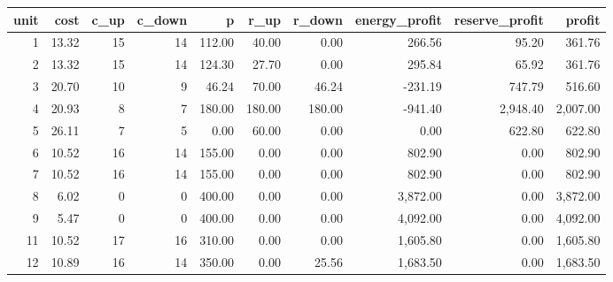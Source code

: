 \begin{tabular}{rrrrrrrrrr}
\toprule
unit & cost & c\_up & c\_down & p & r\_up & r\_down & energy\_profit & reserve\_profit & profit \\
\midrule
1 & 13.32 & 15 & 14 & 112.00 & 40.00 & 0.00 & 266.56 & 95.20 & 361.76 \\
2 & 13.32 & 15 & 14 & 124.30 & 27.70 & 0.00 & 295.84 & 65.92 & 361.76 \\
3 & 20.70 & 10 & 9 & 46.24 & 70.00 & 46.24 & -231.19 & 747.79 & 516.60 \\
4 & 20.93 & 8 & 7 & 180.00 & 180.00 & 180.00 & -941.40 & 2,948.40 & 2,007.00 \\
5 & 26.11 & 7 & 5 & 0.00 & 60.00 & 0.00 & 0.00 & 622.80 & 622.80 \\
6 & 10.52 & 16 & 14 & 155.00 & 0.00 & 0.00 & 802.90 & 0.00 & 802.90 \\
7 & 10.52 & 16 & 14 & 155.00 & 0.00 & 0.00 & 802.90 & 0.00 & 802.90 \\
8 & 6.02 & 0 & 0 & 400.00 & 0.00 & 0.00 & 3,872.00 & 0.00 & 3,872.00 \\
9 & 5.47 & 0 & 0 & 400.00 & 0.00 & 0.00 & 4,092.00 & 0.00 & 4,092.00 \\
11 & 10.52 & 17 & 16 & 310.00 & 0.00 & 0.00 & 1,605.80 & 0.00 & 1,605.80 \\
12 & 10.89 & 16 & 14 & 350.00 & 0.00 & 25.56 & 1,683.50 & 0.00 & 1,683.50 \\
\bottomrule
\end{tabular}
